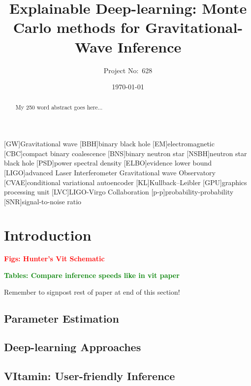 \documentclass[aps,superscriptaddress,twocolumn,nopreprintnumbers,floatfix,groupedaddress]{revtex4-1}
\newcommand{\vitamin}{{\sc VItamin}\xspace}
\begin{document}
\title{Explainable Deep-learning: Monte Carlo methods for Gravitational-Wave Inference}

\author{Project No:~628}
%

\date{\today}

\begin{abstract}
My 250 word abstract goes here...
\end{abstract}

\maketitle

[GW]{Gravitational wave}
[BBH]{binary black hole}
[EM]{electromagnetic}
[CBC]{compact binary coalescence}
[BNS]{binary neutron star}
[NSBH]{neutron star black hole}
[PSD]{power spectral density}
[ELBO]{evidence lower bound}
[LIGO]{advanced Laser Interferometer Gravitational wave Observatory}
[CVAE]{conditional variational autoencoder}
[KL]{Kullback--Leibler}
[GPU]{graphics processing unit}
[LVC]{LIGO-Virgo Collaboration}
[p-p]{probability-probability}
[SNR]{signal-to-noise ratio}

\section{Introduction}\label{intro}

\textbf{\textcolor{red}{Figs: Hunter's Vit Schematic}}

\textbf{\textcolor{green}{Tables: Compare inference speeds like in vit paper}}

Remember to signpost rest of paper at end of this section!

\subsection{Parameter Estimation}

\subsection{Deep-learning Approaches}

\subsection{\vitamin: User-friendly Inference}\label{vit}
\end{document}
